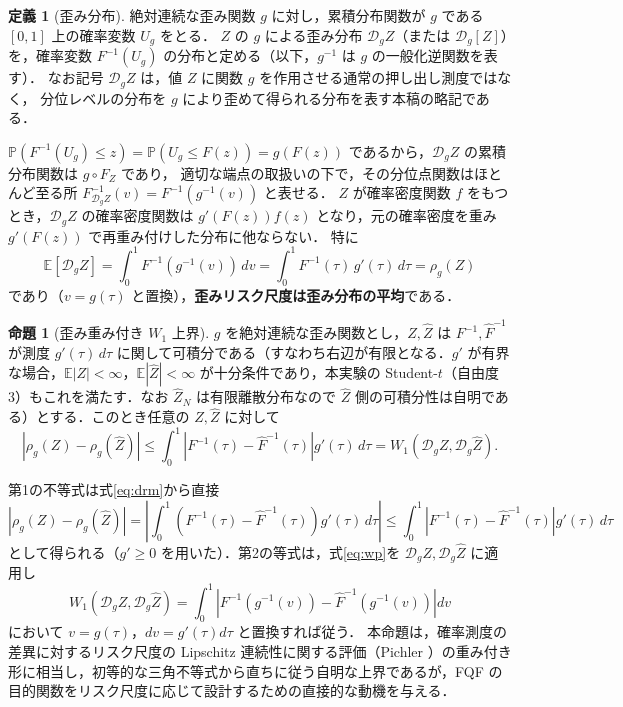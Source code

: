 \documentclass[a4paper,10pt]{jsarticle}
\makeatletter
\theoremstyle{definition}
\newtheorem{definition}{定義}[section]
\newtheorem{proposition}{命題}[section]
\renewenvironment{proof}[1][\proofname]{\par
  \pushQED{\qed}%
  \normalfont \topsep6\p@\@plus6\p@\relax
  \trivlist
  \item[\hskip\labelsep\textbf{#1}]\ignorespaces
}{%
  \popQED\endtrivlist\@endpefalse
}
\renewcommand{\proofname}{証明}
\newcommand{\Wone}{W_1}
\newcommand{\Finv}{F^{-1}}
\newcommand{\Fhinv}{\hat{F}^{-1}}
\newcommand{\E}{\mathbb{E}}
\newcommand{\Prob}{\mathbb{P}}
\newcommand{\dist}{\mathcal{D}_g}
\makeatother
\begin{document}
\begin{definition}[歪み分布]
\label{def:distorted}
絶対連続な歪み関数 $g$ に対し，累積分布関数が $g$ である $[0,1]$ 上の確率変数 $U_g$ をとる．
$Z$ の $g$ による歪み分布 $\dist Z$（または $\mathcal{D}_g[Z]$）を，確率変数 $\Finv(U_g)$ の分布と定める（以下，$g^{-1}$ は $g$ の一般化逆関数を表す）．
なお記号 $\dist Z$ は，値 $Z$ に関数 $g$ を作用させる通常の押し出し測度ではなく，
分位レベルの分布を $g$ により歪めて得られる分布を表す本稿の略記である．
\end{definition}
$\Prob(\Finv(U_g)\le z)=\Prob(U_g\le F(z))=g(F(z))$ であるから，$\dist Z$ の累積分布関数は $g\circ F_Z$ であり，
適切な端点の取扱いの下で，その分位点関数はほとんど至る所
$F^{-1}_{\dist Z}(v)=\Finv(g^{-1}(v))$ と表せる．
$Z$ が確率密度関数 $f$ をもつとき，$\dist Z$ の確率密度関数は $g'(F(z))f(z)$ となり，元の確率密度を重み $g'(F(z))$ で再重み付けした分布に他ならない．
特に
\begin{equation}
  \E[\dist Z]=\int_0^1\Finv(g^{-1}(v))\,dv=\int_0^1\Finv(\tau)\,g'(\tau)\,d\tau=\rho_g(Z)
  \label{eq:drm-as-mean}
\end{equation}
であり（$v=g(\tau)$ と置換），\textbf{歪みリスク尺度は歪み分布の平均}である．

\begin{proposition}[歪み重み付き $\Wone$ 上界]
\label{prop:bound}
$g$ を絶対連続な歪み関数とし，$Z,\hat Z$ は $\Finv,\Fhinv$ が測度 $g'(\tau)\,d\tau$ に関して可積分である（すなわち右辺が有限となる．$g'$ が有界な場合，$\E|Z|<\infty$，$\E|\hat Z|<\infty$ が十分条件であり，本実験の Student-$t$（自由度3）もこれを満たす．なお $\hat Z_N$ は有限離散分布なので $\hat Z$ 側の可積分性は自明である）とする．このとき任意の $Z,\hat Z$ に対して
\begin{equation}
  \left|\rho_g(Z)-\rho_g(\hat Z)\right|
  \le\int_0^1\left|\Finv(\tau)-\Fhinv(\tau)\right|g'(\tau)\,d\tau
  =\Wone(\dist Z,\dist\hat Z).
  \label{eq:bound}
\end{equation}
\end{proposition}
\begin{proof}
第1の不等式は式\eqref{eq:drm}から直接
\begin{equation*}
  \left|\rho_g(Z)-\rho_g(\hat Z)\right|=\left|\int_0^1\left(\Finv(\tau)-\Fhinv(\tau)\right)g'(\tau)\,d\tau\right|
  \le\int_0^1\left|\Finv(\tau)-\Fhinv(\tau)\right|g'(\tau)\,d\tau
\end{equation*}
として得られる（$g'\ge0$ を用いた）．第2の等式は，式\eqref{eq:wp}を $\dist Z,\dist\hat Z$ に適用し
\begin{equation*}
  \Wone(\dist Z,\dist\hat Z)=\int_0^1\left|\Finv(g^{-1}(v))-\Fhinv(g^{-1}(v))\right|dv
\end{equation*}
において $v=g(\tau)$，$dv=g'(\tau)d\tau$ と置換すれば従う．
\end{proof}
本命題は，確率測度の差異に対するリスク尺度の Lipschitz 連続性に関する評価（Pichler \cite{pichler2013evaluations}）の重み付き形に相当し，初等的な三角不等式から直ちに従う自明な上界であるが，FQF の目的関数をリスク尺度に応じて設計するための直接的な動機を与える．
\end{document}
